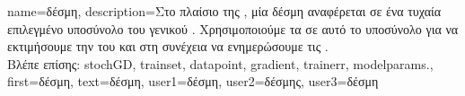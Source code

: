 {name={\foreignlanguage{greek}{δέσμη}},
	description={\foreignlanguage{greek}{Στο πλαίσιο της} 
		, \foreignlanguage{greek}{μία δέσμη αναφέρεται σε ένα τυχαία επιλεγμένο υποσύνολο 
		του γενικού} . \foreignlanguage{greek}{Χρησιμοποιούμε τα}  
		\foreignlanguage{greek}{σε αυτό το υποσύνολο για να εκτιμήσουμε την} 
		 \foreignlanguage{greek}{του}  \foreignlanguage{greek}{και στη συνέχεια 
		να ενημερώσουμε τις} .\\
		\foreignlanguage{greek}{Βλέπε επίσης:} \gls{stochGD}, \gls{trainset}, \gls{datapoint}, \gls{gradient}, \gls{trainerr}, \gls{modelparams}.}, 
	first={\foreignlanguage{greek}{δέσμη}},
	text={\foreignlanguage{greek}{δέσμη}},
	user1={\foreignlanguage{greek}{δέσμη}}, %
    	user2={\foreignlanguage{greek}{δέσμης}}, %
	user3={\foreignlanguage{greek}{δέσμη}} %
}

